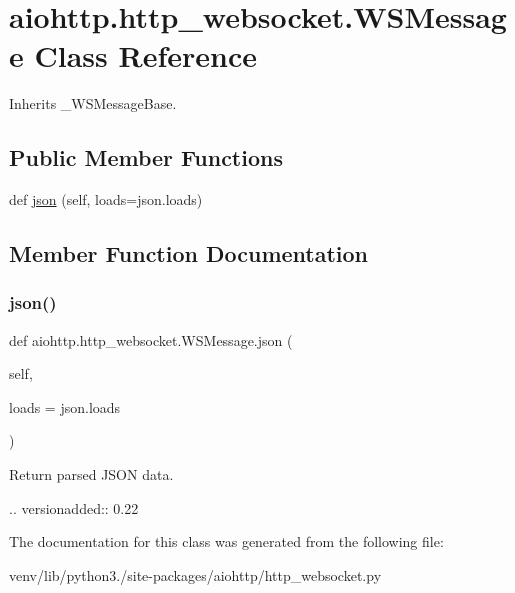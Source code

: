 \hypertarget{classaiohttp_1_1http__websocket_1_1_w_s_message}{}\section{aiohttp.\+http\+\_\+websocket.\+W\+S\+Message Class Reference}
\label{classaiohttp_1_1http__websocket_1_1_w_s_message}


Inherits \+\_\+\+W\+S\+Message\+Base.

\subsection*{Public Member Functions}
\begin{DoxyCompactItemize}
\item 
def \hyperlink{classaiohttp_1_1http__websocket_1_1_w_s_message_ac3db6c77af154d4c6404a3c432a9878e}{json} (self, loads=json.\+loads)
\end{DoxyCompactItemize}


\subsection{Member Function Documentation}
\mbox{\label{classaiohttp_1_1http__websocket_1_1_w_s_message_ac3db6c77af154d4c6404a3c432a9878e}} 
\subsubsection{\texorpdfstring{json()}{json()}}
{\footnotesize\ttfamily def aiohttp.\+http\+\_\+websocket.\+W\+S\+Message.\+json (\begin{DoxyParamCaption}\item[{}]{self,  }\item[{}]{loads = {\ttfamily json.loads} }\end{DoxyParamCaption})}

\begin{DoxyVerb}Return parsed JSON data.

.. versionadded:: 0.22
\end{DoxyVerb}
 

The documentation for this class was generated from the following file\+:\begin{DoxyCompactItemize}
\item 
venv/lib/python3./site-\/packages/aiohttp/http\+\_\+websocket.\+py\end{DoxyCompactItemize}
